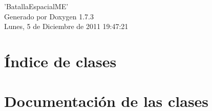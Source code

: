\documentclass[a4paper]{book}
\begin{document}
\hypersetup{pageanchor=false}
\begin{titlepage}
\vspace*{7cm}
\begin{center}
{\Large 'BatallaEspacialME' }\\
\vspace*{1cm}
{\large Generado por Doxygen 1.7.3}\\
\vspace*{0.5cm}
{\small Lunes, 5 de Diciembre de 2011 19:47:21}\\
\end{center}
\end{titlepage}
\clearemptydoublepage
{}
\tableofcontents
\clearemptydoublepage
{}
\hypersetup{pageanchor=true}
\chapter{Índice de clases}

\chapter{Documentación de las clases}















\printindex
\end{document}
